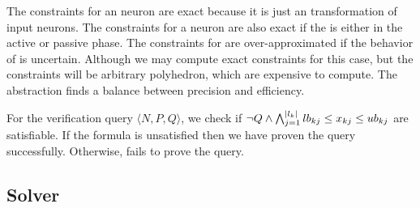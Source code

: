 \begin{itemize}
\end{itemize}

The constraints for an \affine{} neuron are exact because it is just an \affine{}
transformation of input neurons. 
The constraints for a \relu{} neuron are also exact if the \relu{} is either
in the active or passive phase. 
The constraints for \relu{} are over-approximated if the behavior of \relu{}
is uncertain. Although we may compute exact 
constraints for this case, but the constraints will be arbitrary polyhedron,
which are expensive to compute.
The \deeppoly{} abstraction finds a balance between precision and efficiency.

For the verification query $\langle N, P, Q \rangle$, we check if
$\lnot Q \land \bigwedge_{j=1}^{|l_k|}lb_{kj} \leq x_{kj} \leq ub_{kj}$
are satisfiable.
%
If the formula is unsatisfied then we have proven the query successfully.
Otherwise, \deeppoly{} fails to prove the query.




\subsection{Solver}
\label{sec:solver}

